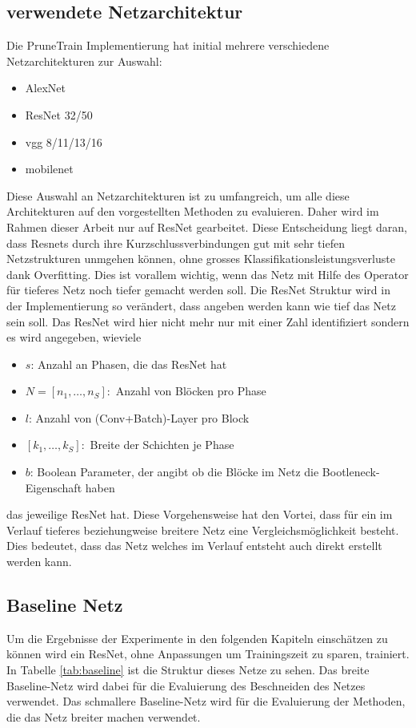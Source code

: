 \subsection{verwendete Netzarchitektur}\label{sec:archi}
Die PruneTrain Implementierung hat initial mehrere verschiedene Netzarchitekturen zur Auswahl:
\begin{itemize}
 \item AlexNet
 \item ResNet 32/50
 \item vgg 8/11/13/16
 \item mobilenet
\end{itemize}

Diese Auswahl an Netzarchitekturen ist zu umfangreich, um alle diese Architekturen auf den vorgestellten Methoden zu evaluieren. Daher wird im Rahmen dieser Arbeit nur auf ResNet gearbeitet. Diese Entscheidung liegt daran, dass Resnets durch ihre Kurzschlussverbindungen gut mit sehr tiefen Netzstrukturen unmgehen können, ohne grosses Klassifikationsleistungsverluste dank Overfitting. Dies ist vorallem wichtig, wenn das Netz mit Hilfe des Operator für tieferes Netz noch tiefer gemacht werden soll. Die ResNet Struktur wird in der Implementierung so verändert, dass angeben werden kann wie tief das Netz sein soll. Das ResNet wird hier nicht mehr nur mit einer Zahl identifiziert sondern es wird angegeben, wieviele
\begin{itemize}
 \item $s$: Anzahl an Phasen, die das ResNet hat
 \item $N=[n_1, \ldots, n_S]:$ Anzahl von Blöcken pro Phase 
 \item $l$: Anzahl von (Conv+Batch)-Layer pro Block
 \item $[k_1, \ldots,k_S ]:$ Breite der Schichten je Phase
 \item $b$: Boolean Parameter, der angibt ob die Blöcke im Netz die Bootleneck-Eigenschaft haben
\end{itemize}
das jeweilige ResNet hat. Diese Vorgehensweise hat den Vortei, dass für ein im Verlauf tieferes beziehungweise breitere Netz eine Vergleichsmöglichkeit besteht. Dies bedeutet, dass das Netz welches im Verlauf entsteht auch direkt erstellt werden kann.


\color{blue1}
\subsection{Baseline Netz}\label{sec:baseline}
Um die Ergebnisse der Experimente in den folgenden Kapiteln einschätzen zu können wird ein ResNet, ohne Anpassungen um Trainingszeit zu sparen, trainiert. In Tabelle \ref{tab:baseline} ist die Struktur dieses Netze zu sehen. Das breite Baseline-Netz wird dabei für die Evaluierung des Beschneiden des Netzes verwendet. Das schmallere Baseline-Netz wird für die Evaluierung der Methoden, die das Netz breiter machen verwendet.

